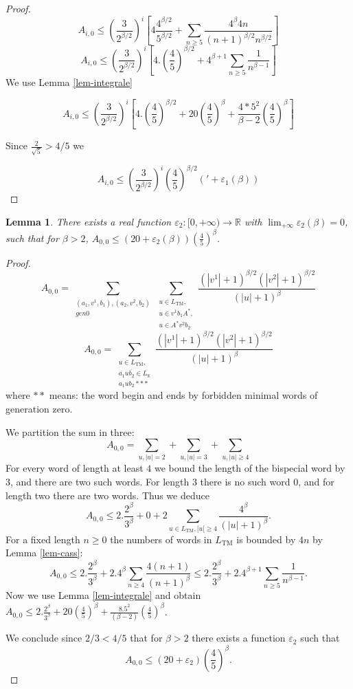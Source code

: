 \documentclass[11 pt]{article}
\newtheorem{lemma}[proposition]{Lemma}
\def\R{{\mathbb R}}
\def\K{{\mathbb K}}
\theoremstyle{definition}
\begin{document}
\begin{proof}
$$A_{i,0}\leq (\frac{3}{2^{\beta/2}})^i[4\frac{4^{\beta/2}}{5^{\beta/2}}+\sum_{n\geq 5} \frac{4^\beta 4n}{(n+1)^{\beta/2}n^{\beta/2}}]$$
$$A_{i,0}\leq (\frac{3}{2^{\beta/2}})^i[4. (\frac{4}{5})^{\beta/2}+4^{\beta+1}\sum_{n\geq 5} \frac{1}{n^{\beta-1}}]$$
We use Lemma \ref{lem-integrale}

$$A_{i,0}\leq (\frac{3}{2^{\beta/2}})^i[4. (\frac{4}{5})^{\beta/2}+
20(\frac{4}{5})^{\beta}+
\frac{4*5^2}{\beta-2}(\frac{4}{5})^{\beta}]$$

Since $\frac{2}{\sqrt 5}>4/5$ we 

$$A_{i,0}\leq (\frac{3}{2^{\beta/2}})^i(\frac{4}{5})^{\beta/2}('+\varepsilon_1(\beta))$$




\end{proof}

\begin{lemma}\label{lem-calcul2}
There exists a real function $\varepsilon_2:[0,+\infty)\rightarrow \R$  with $\lim_{+\infty} \varepsilon_2(\beta)=0$, such that for $\beta>2$, $A_{0,0}\leq (20+\varepsilon_2(\beta))(\frac{4}{5})^\beta$.

\end{lemma}
\begin{proof}
$$A_{0,0}=\sum_{\substack{(a_1, v^1,b_1),(a_2, v^2, b_2)\\ gen 0}}\sum_{\substack{u\in L_{\mathrm{TM}},\\ u\in v^1b_1A^*,\\ u\in A^* v^2b_2}}\frac{(|v^1|+1)^{\beta/2}(|v^2|+1)^{\beta/2}}{(|u|+1)^\beta}$$
$$A_{0,0}=\sum_{\substack{u\in L_{\mathrm{TM}},\\ \overline{a_1}u\overline{b_2}\in L_\K\\ a_1ub_2 ***}}\frac{(|v^1|+1)^{\beta/2}(|v^2|+1)^{\beta/2}}{(|u|+1)^\beta}$$
where $**$ means: the word begin and ends by forbidden minimal words of generation zero.

We partition the sum in three:
$$A_{0,0}=\sum_{u, |u|=2}+\sum_{u, |u|=3}+\sum_{u, |u|\geq 4}$$
For every word of length at least $4$ we bound the length of the bispecial word by $3$, and there are two such words. For length $3$ there is no such word $0$, and for length two there are two words. Thus we deduce
$$A_{0,0}\leq 2. \frac{2^\beta}{3^\beta}+0+2\sum_{u\in L_{\mathrm{TM}},[u[\geq 4} \frac{4^\beta}{(|u|+1)^\beta}.$$
For a fixed length $n\geq 0$ the numbers of words in $L_{\mathrm{TM}}$ is bounded by $4n$ by Lemma \ref{lem-cass}:
$$A_{0,0}\leq 2. \frac{2^\beta}{3^\beta}+2.4^{\beta}\sum_{n\geq 4} \frac{4(n+1)}{(n+1)^\beta}\leq 2. \frac{2^\beta}{3^\beta}+2.4^{\beta+1}\sum_{n\geq 5}\frac{1}{n^{\beta-1}}.$$
Now we use Lemma \ref{lem-integrale} and obtain
$A_{0,0}\leq 2. \frac{2^\beta}{3^\beta}+20(\frac{4}{5})^{\beta}+\frac{8.5^2}{(\beta-2)}(\frac{4}{5})^\beta$.

We conclude since $2/3<4/5$ that for $\beta>2$ there exists a function $\varepsilon_2$ such that 
$$A_{0,0}\leq (20+\varepsilon_2)(\frac{4}{5})^\beta.$$

\end{proof}
\end{document}
